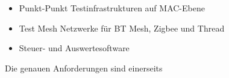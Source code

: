 \begin{itemize}
 	\item Punkt-Punkt Testinfrastrukturen auf MAC-Ebene
 	\item Test Mesh Netzwerke für BT Mesh, Zigbee und Thread
 	\item Steuer- und Auswertesoftware
\end{itemize}

Die genauen Anforderungen sind einerseits 








